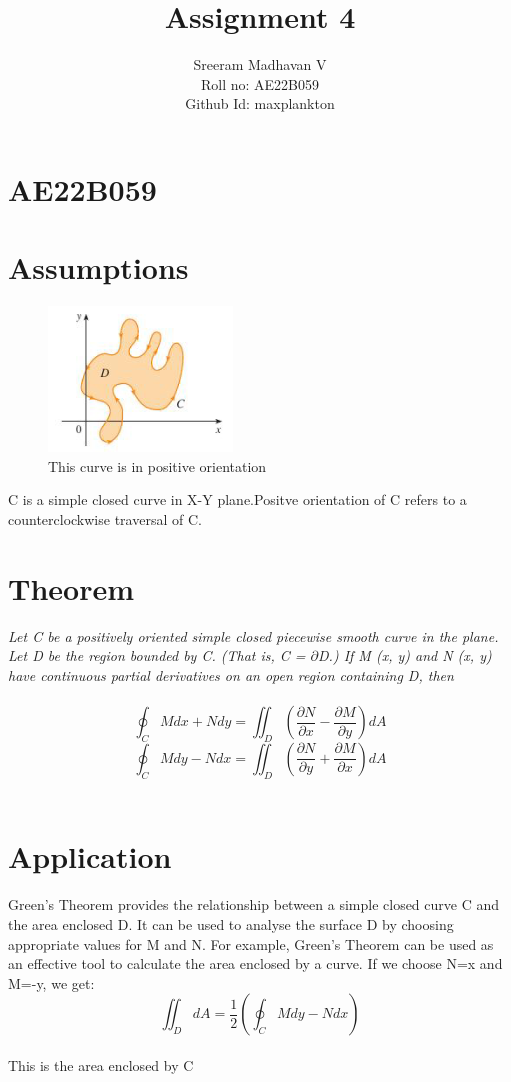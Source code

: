 \documentclass{article}
\title{Assignment 4}
\author{Sreeram Madhavan V\\Roll no: AE22B059\\Github Id: maxplankton}
\date{}
\begin{document}
\maketitle

\section*{AE22B059}
\section*{Assumptions}
\begin{figure}[h!]
    \centering
    \includegraphics{Screenshot from 2023-06-18 01-03-52.png}
    \caption{This curve is in positive orientation}
    \label{fig:enter-label}
\end{figure}
C is a simple closed curve in X-Y plane.Positve orientation of C refers to a counterclockwise traversal of C.
\section*{Theorem}
\emph{Let C be a positively oriented simple closed piecewise smooth
curve in the plane. Let D be the region bounded by C. (That is, C = $\partial$D.) If M (x, y) and N (x, y)
have continuous partial derivatives on an open region containing D, then}\\\\
\begin{equation}
\oint_{C}Mdx+Ndy=\iint_{D}(\frac{\partial N}{\partial x}-\frac{\partial M}{\partial y})dA 
\end{equation}
\begin{equation}
\oint_{C}Mdy-Ndx=\iint_{D}(\frac{\partial N}{\partial y}+\frac{\partial M}{\partial x})dA
\end{equation} ~\cite{singh2022multivariable}
\section*{Application}

Green's Theorem provides the relationship between a simple closed curve C and the area enclosed D.
It can be used to analyse the surface D by choosing appropriate values for M and N. For example, Green's Theorem can be used as an effective tool to calculate the area enclosed by a curve. If we choose N=x and M=-y, we get:\\
\begin{equation}
\iint_{D}dA =\frac{1}{2}(\oint_{C}Mdy-Ndx)
\end{equation}\\
This is the area enclosed by C ~\cite{thomas1952calculus}



\end{document}
